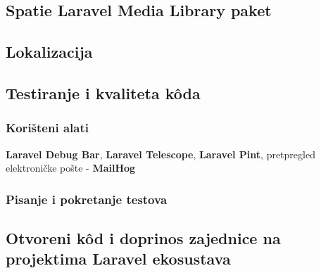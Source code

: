 \subsection{Spatie Laravel Media Library paket}

\subsection{Lokalizacija}
\label{subsection:localization}

\subsection{Testiranje i kvaliteta k\^oda}

\subsubsection{Korišteni alati}
\textbf{Laravel Debug Bar}, \textbf{Laravel Telescope}, \textbf{Laravel Pint}, pretpregled elektroničke pošte - \textbf{MailHog}

\subsubsection{Pisanje i pokretanje testova}

\subsection{Otvoreni k\^od i doprinos zajednice na projektima Laravel ekosustava}
